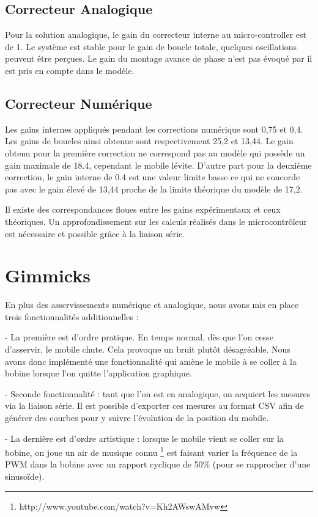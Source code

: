 \documentclass[11pt, french]{article} %
\begin{document}
\subsection{Correcteur Analogique}
Pour la solution analogique, le gain du correcteur interne au micro-controller est de 1. Le système est stable pour le gain de boucle totale, quelques oscillations peuvent être perçues. Le gain du montage avance de phase n'est pas évoqué par il est pris en compte dans le modèle.
\subsection{Correcteur Numérique}
Les gains internes appliqués pendant les corrections numérique sont 0,75 et 0,4. Les gains de boucles ainsi obtenue sont respectivement 25,2 et 13,44. Le gain obtenu pour la première correction ne correspond pas au modèle qui possède un gain maximale de 18.4, cependant le mobile lévite. D'autre part pour la deuxième correction, le gain interne de 0.4 est une valeur limite basse ce qui ne concorde pas avec le gain élevé de 13,44 proche de la limite théorique du modèle de 17,2.

Il existe des correspondances floues entre les gains expérimentaux et ceux théoriques. Un approfondissement sur les calculs réalisés dans le microcontrôleur est nécessaire et possible grâce à la liaison série.

\section{Gimmicks}
 
 En plus des asservissements numérique et analogique, nous avons mis en place trois fonctionnalités additionnelles :
 
 \medskip
 
 - La première est d'ordre pratique. En temps normal, dès que l'on cesse d'asservir, le mobile chute. Cela provoque un bruit plutôt désagréable. Nous avons donc implémenté une fonctionnalité qui amène le mobile à se coller à la bobine lorsque l'on quitte l'application graphique. 
 
 - Seconde fonctionnalité : tant que l'on est en analogique, on acquiert les mesures via la liaison série. Il est possible d'exporter ces mesures au format CSV afin de générer des courbes pour y suivre l'évolution de la position du mobile.
 
  - La dernière est d'ordre artistique : lorsque le mobile vient se coller sur la bobine, on joue un air de musique connu \footnote{http://www.youtube.com/watch?v=Kh2AWswAMvw} est faisant varier la fréquence de la PWM dans la bobine avec un rapport cyclique de 50\% (pour se rapprocher d'une sinusoïde). 
  
\end{document}
